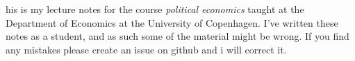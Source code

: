 his is my lecture notes for the course \emph{political economics} taught at the Department of Economics at the University of Copenhagen. I've written these notes as a student, and as such some of the material might be wrong. If you find any mistakes please create an issue on github and i will correct it. 
